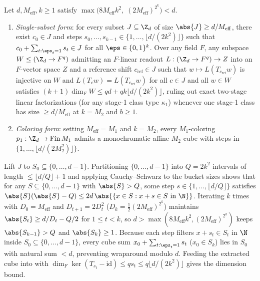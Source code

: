 \begin{lemma}\label{lem:cs-cube}
Let $d, M_{\mathrm{eff}}, k \ge 1$ satisfy $\max\bigl(8 M_{\mathrm{eff}} k^2,\;
(2 M_{\mathrm{eff}})^{2^k}\bigr) < d$.
\begin{enumerate}[label=(\alph*)]
\item \emph{Single-subset form}: for every subset $J \subseteq \Z_d$ of size $\abs{J} \ge
  d / M_{\mathrm{eff}}$, there exist $c_0 \in J$ and steps
  $s_0, \dots, s_{k-1} \in \{1, \dots, \lfloor d/(2k^2)\rfloor\}$ such that
  $c_0 + \sum_{t : \eps_t = 1} s_t \in J$ for all $\eps \in \{0,1\}^k$. Over any field $F$, any
  subspace $W \le (\Z_d \to F^q)$ admitting an $F$-linear readout $L : (\Z_d \to F^q) \to Z$ into an
  $F$-vector space $Z$ and a reference shift $c_{\mathrm{ref}} \in J$ such that
  $w \mapsto L(T_{c_{\mathrm{ref}}} w)$ is injective on $W$ and
  $L(T_c w) = L(T_{c_{\mathrm{ref}}} w)$ for all $c \in J$ and all $w \in W$ satisfies
  $(k + 1)\dim_F W \le q d + q k \lfloor d / (2 k^2)\rfloor$, ruling out exact two-stage linear
  factorizations (for any stage-1 class type $\kappa_1$) whenever one stage-1 class has size
  $\ge d / M_{\mathrm{eff}}$ at $k = M_2$ and $b \ge 1$.
\item \emph{Coloring form}: setting $M_{\mathrm{eff}} = M_1$ and $k = M_2$, every $M_1$-coloring
  $p_1 : \Z_d \to \mathrm{Fin}\,M_1$ admits a monochromatic affine $M_2$-cube with steps in
  $\{1, \dots, \lfloor d/(2 M_2^2)\rfloor\}$.
\end{enumerate}
\end{lemma}
\begin{outline}
Lift $J$ to $S_0 \subseteq \{0,\dots,d-1\}$. Partitioning $\{0,\dots,d-1\}$ into $Q = 2k^2$ intervals
of length $\le \lfloor d/Q\rfloor + 1$ and applying Cauchy--Schwarz to the bucket sizes shows that for
any $S \subseteq \{0,\dots,d-1\}$ with $\abs{S} > Q$, some step $s \in \{1, \dots, \lfloor d/Q\rfloor\}$
satisfies $\abs{S}(\abs{S} - Q) \le 2d\,\abs{\{x \in S : x + s \in S \text{ in }\N\}}$. Iterating $k$
times with $D_0 = M_{\mathrm{eff}}$ and $D_{t+1} = 2 D_t^2$ ($D_k = \frac{1}{2}(2 M_{\mathrm{eff}})^{2^k}$)
maintains $\abs{S_t} \ge d/D_t - Q/2$ for $1 \le t < k$, so
$d > \max(8 M_{\mathrm{eff}} k^2, (2M_{\mathrm{eff}})^{2^k})$ keeps $\abs{S_{k-1}} > Q$ and
$\abs{S_k} \ge 1$. Because each step filters $x + s_t \in S_t$ in $\N$ inside
$S_0 \subseteq \{0,\dots,d-1\}$, every cube sum $x_0 + \sum_{t : \eps_t = 1} s_t$ ($x_0 \in S_k$) lies
in $S_0$ with natural sum $< d$, preventing wraparound modulo $d$. Feeding the extracted cube into
 with $\dim_F\ker(T_{s_t} - \mathrm{id}) \le q s_t \le q\lfloor d/(2k^2)\rfloor$
gives the dimension bound.
\end{outline}

